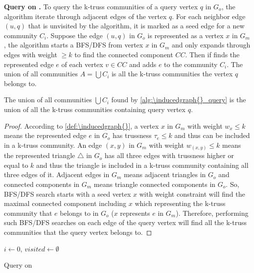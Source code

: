 \vskip 0.1in \noindent \textbf{Query on \InducedGraph{}.} To query the k-truss communities of a query vertex $q$ in $G_o$, the algorithm iterate through adjacent edges of the vertex $q$. For each neighbor edge $(u,q)$ that is unvisited by the algorithm, it is marked as a seed edge for a new community $C_i$. Suppose the edge $(u,q)$ in $G_o$ is represented as a vertex $x$ in $G_m$, the algorithm starts a BFS/DFS from vertex $x$ in $G_m$ and only expands through edges with weight $\ge k$ to find the connected component $CC$. Then if finds the represented edge $e$ of each vertex $v \in CC$ and adds $e$ to the community $C_i$. The union of all communities $A = \bigcup C_i$ is all the k-truss communities the vertex $q$ belongs to.

\begin{Thm}
The union of all communities $\bigcup C_i$ found by \autoref{alg:\inducedgraph{}_query} is the union of all the k-truss communities containing query vertex $q$.
\label{thm:\inducedgraph{}_query}
\end{Thm}

\begin{proof}
According to \autoref{def:\inducedgraph{}}, a vertex $x$ in \inducedgraph{} $G_m$ with weight $w_{x} \le k$ means the represented edge $e$ in $G_o$ has trussness $\tau_{e} \le k$ and thus can be included in a k-truss community. An edge $(x,y)$ in \inducedgraph{} $G_m$ with weight $w_{(x,y)} \le k$ means the represented triangle $\triangle$ in $G_o$ has all three edges with trussness higher or equal to $k$ and thus the triangle is included in a k-truss community containing all three edges of it. Adjacent edges in $G_m$ means adjacent triangles in $G_o$ and connected components in $G_m$ means triangle connected components in $G_o$. So, BFS/DFS search starts with a seed vertex $x$ with weight constraint will find the maximal connected component including $x$ which representing the k-truss community that $e$ belongs to in $G_o$ ($x$ represents $e$ in $G_m$). Therefore, performing such BFS/DFS searches on each edge of the query vertex will find all the k-truss communities that the query vertex belongs to.
\end{proof}

\begin{algorithm}
	\BlankLine
	$i \gets 0$, $visited \gets \emptyset$\;
	\caption{Query on \inducedgraph{}}\label{alg:\inducedgraph{}_query}
\end{algorithm}

